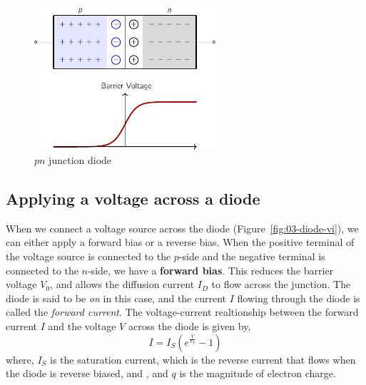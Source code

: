 \begin{figure}[t]
    \centering
    \includegraphics[width=0.6\textwidth]{figure/ch03/fig03-02.pdf}
    \caption{$pn$ junction diode}
    \label{fig:03-02}
\end{figure}

\subsection{Applying a voltage across a diode}
When we connect a voltage source across the diode (Figure~\ref{fig:03-diode-vi}), we can either apply a forward bias or a reverse bias. When the positive terminal of the voltage source is connected to the $p$-side and the negative terminal is connected to the $n$-side, we have a \textbf{forward bias}. This reduces the barrier voltage $V_0$, and allows the diffusion current $I_D$ to flow across the junction. The diode is said to be \textit{on} in this case, and the current $I$ flowing through the diode is called the \textit{forward current}. The voltage-current realtionship between the forward current $I$ and the voltage $V$ across the diode is given by,
\begin{equation}
    I = I_S \left( e^{\frac{V}{V_T}} - 1 \right)
    \label{eq:ch03-forward-bias-vi}
\end{equation}
where, $I_S$ is the saturation current, which is the reverse current that flows when the diode is reverse biased, and , and $q$ is the magnitude of electron charge.

